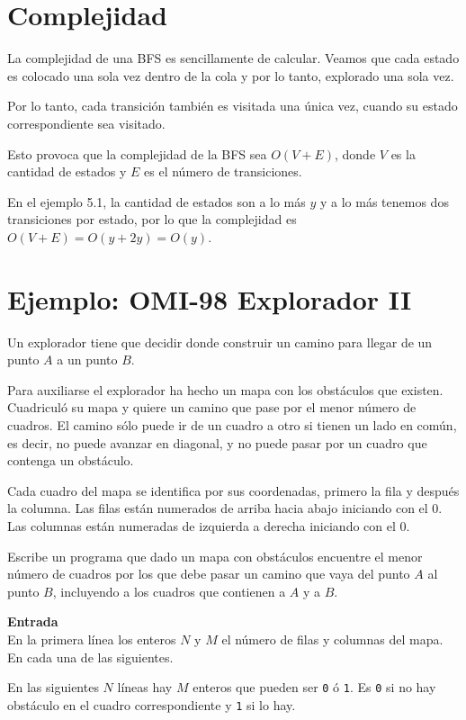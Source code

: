 \section{Complejidad}
La complejidad de una BFS es sencillamente de calcular. Veamos que cada estado es colocado una sola vez dentro de la cola y por lo tanto, explorado una sola vez.

Por lo tanto, cada transición también es visitada una única vez, cuando su estado correspondiente sea visitado.

Esto provoca que la complejidad de la BFS sea \(O(V+E)\), donde \(V\) es la cantidad de estados y \(E\) es el número de transiciones.

En el ejemplo 5.1, la cantidad de estados son a lo más \(y\) y a lo más tenemos dos transiciones por estado, por lo que la complejidad es \(O(V+E)=O(y+2y)=O(y)\).\\

\section*{Ejemplo: OMI-98 Explorador II}

Un explorador tiene que decidir donde construir un camino para llegar de un punto \(A\) a un punto \(B\). 

Para auxiliarse el explorador ha hecho un mapa con los obstáculos que existen. Cuadriculó su mapa y quiere un camino que pase por el menor número de cuadros. El camino sólo puede ir de un cuadro a otro si tienen un lado en común, es decir, no puede avanzar en diagonal, y no puede pasar por un cuadro que contenga un obstáculo. 

Cada cuadro del mapa se identifica por sus coordenadas, primero la fila y después la columna. Las filas están numerados de arriba hacia abajo iniciando con el \(0\). Las columnas están numeradas de izquierda a derecha iniciando con el \(0\).

Escribe un programa que dado un mapa con obstáculos encuentre el menor número de cuadros por los que debe pasar un camino que vaya del punto \(A\) al punto \(B\), incluyendo a los cuadros que contienen a \(A\) y a \(B\).

\textbf{Entrada}\\
En la primera línea los enteros \(N\) y \(M\) el número de filas y columnas del mapa. En cada una de las siguientes.

En las siguientes \(N\) líneas hay \(M\) enteros que pueden ser \verb|0| ó \verb|1|. Es \verb|0| si no hay obstáculo en el cuadro correspondiente y \verb|1| si lo hay.

